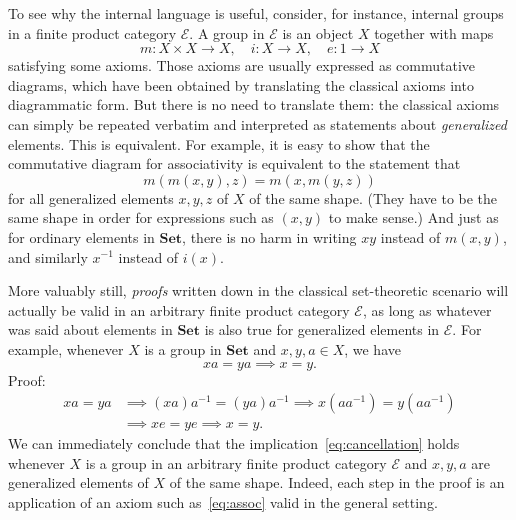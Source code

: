 \documentclass[12pt]{article}
\newcommand{\cat}[1]{\mathscr{#1}}
\newcommand{\fcat}[1]{\mathbf{#1}}
\newcommand{\Set}{\fcat{Set}}
\newcommand{\E}{\cat{E}}
\newcommand{\cln}{\colon}
\begin{document}
To see why the internal language is useful, consider, for instance, internal
groups in a finite product category $\E$.  A group in $\E$ is an object $X$
together with maps
\[
m\cln X \times X \to X,
\quad
i\cln X \to X,
\quad
e\cln 1 \to X
\]
satisfying some axioms.  Those axioms are usually expressed as commutative
diagrams, which have been obtained by translating the classical axioms into
diagrammatic form.  But there is no need to translate them: the classical
axioms can simply be repeated verbatim and interpreted as statements about
\emph{generalized} elements.  This is equivalent.  For example, it is easy to
show that the commutative diagram for associativity is equivalent to the
statement that
% 
\begin{equation}        \label{eq:assoc}
m(m(x, y), z) = m(x, m(y, z))
\end{equation}
% 
for all generalized elements $x, y, z$ of $X$ of the same shape.  (They have
to be the same shape in order for expressions such as $(x, y)$ to make sense.)
And just as for ordinary elements in $\Set$, there is no harm in writing $xy$
instead of $m(x, y)$, and similarly $x^{-1}$ instead of $i(x)$.

More valuably still, \emph{proofs} written down in the classical set-theoretic
scenario will actually be valid in an arbitrary finite product category $\E$,
as long as whatever was said about elements in $\Set$ is also true for
generalized elements in $\E$.  For example, whenever $X$ is a group in $\Set$
and $x, y, a \in X$, we have
% 
\begin{equation}        \label{eq:cancellation}
xa = ya \implies x = y.
\end{equation}
% 
Proof:
% 
\begin{align*}
xa = ya &
\implies
(xa)a^{-1} = (ya)a^{-1}
\implies
x(a a^{-1}) = y(a a^{-1})       \\
&
\implies
xe = ye
\implies
x = y.
\end{align*}
% 
We can immediately conclude that the implication~\eqref{eq:cancellation} holds
whenever $X$ is a group in an arbitrary finite product category $\E$ and $x,
y, a$ are generalized elements of $X$ of the same shape.  Indeed, each step in
the proof is an application of an axiom such as~\eqref{eq:assoc} valid in the
general setting.  
\end{document}
